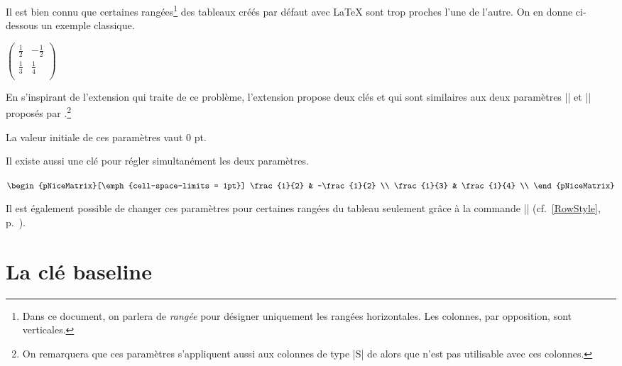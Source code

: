 \documentclass[dvipsnames]{article}
\begin{document}
Il est bien connu que certaines rangées\footnote{Dans ce document, on parlera de
  \emph{rangée} pour désigner uniquement les rangées horizontales. Les colonnes,
  par opposition, sont verticales.} des tableaux créés par défaut avec LaTeX
sont trop proches l'une de l'autre. On en donne ci-dessous un exemple classique.

\medskip
\begin{Code}[width=9cm,show-output]
$\begin{pmatrix}
\frac{1}{2} & -\frac{1}{2} \\
\frac{1}{3} & \frac{1}{4} \\
\end{pmatrix}$
\end{Code}

\medskip
En s'inspirant de l'extension  qui traite de ce problème,
l'extension  propose deux clés 
et  qui sont similaires aux deux paramètres
|\cellspacetoplimit| et |\cellspacebottomlimit| proposés par .\footnote{On
  remarquera que ces paramètres s'appliquent aussi aux colonnes de type |S| de
   alors que  n'est pas utilisable avec ces
  colonnes.}


\smallskip
La valeur initiale de ces paramètres vaut $0$ pt.


\smallskip
Il existe aussi une clé  pour régler simultanément
les deux paramètres.

\medskip
\begin{Code}[width=9cm,show-output,no-cell-nodes]
$\begin{pNiceMatrix}[\emph{cell-space-limits = 1pt}]
\frac{1}{2} & -\frac{1}{2} \\
\frac{1}{3} & \frac{1}{4} \\
\end{pNiceMatrix}$
\end{Code}

\bigskip
Il est également possible de changer ces paramètres pour certaines rangées du
tableau seulement grâce à la commande |\RowStyle|
(cf.~\ref{RowStyle}, p.~\pageref{RowStyle}).



\medskip
\section{La clé baseline}
\end{document}
